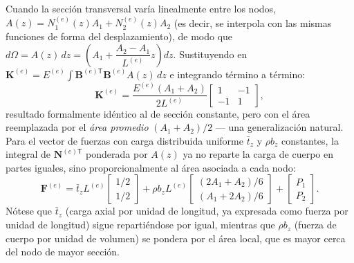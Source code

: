 Cuando la sección transversal varía linealmente entre los nodos, $A(z) = N_1^{(e)}(z)A_1 + N_2^{(e)}(z)A_2$ (es decir, se interpola con las mismas funciones de forma del desplazamiento), de modo que $d\Omega = A(z)\,dz = \left(A_1 + \dfrac{A_2-A_1}{L^{(e)}}z\right)dz$. Sustituyendo en $\bm K^{(e)} = E^{(e)}\int \bm B^{(e)\mathsf T}\bm B^{(e)}A(z)\,dz$ e integrando término a término:
\[
\bm K^{(e)} = \frac{E^{(e)}(A_1+A_2)}{2L^{(e)}} \begin{bmatrix} 1 & -1 \\ -1 & 1 \end{bmatrix},
\]
resultado formalmente idéntico al de sección constante, pero con el área reemplazada por el \emph{área promedio} $(A_1+A_2)/2$ --- una generalización natural. Para el vector de fuerzas con carga distribuida uniforme $\bar t_z$ y $\rho b_z$ constantes, la integral de $\bm N^{(e)\mathsf T}$ ponderada por $A(z)$ ya no reparte la carga de cuerpo en partes iguales, sino proporcionalmente al área asociada a cada nodo:
\[
\bm F^{(e)} = \bar t_z L^{(e)} \begin{bmatrix} 1/2 \\ 1/2 \end{bmatrix} + \rho b_z L^{(e)} \begin{bmatrix} (2A_1+A_2)/6 \\ (A_1+2A_2)/6 \end{bmatrix} + \begin{bmatrix} P_1 \\ P_2 \end{bmatrix} .
\]
Nótese que $\bar t_z$ (carga axial por unidad de longitud, ya expresada como fuerza por unidad de longitud) sigue repartiéndose por igual, mientras que $\rho b_z$ (fuerza de cuerpo por unidad de volumen) se pondera por el área local, que es mayor cerca del nodo de mayor sección.

